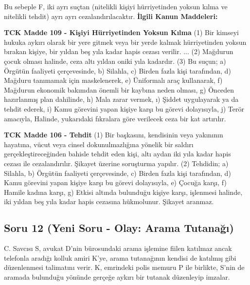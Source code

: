 \documentclass[a4paper, 11pt, twocolumn]{article}
\newenvironment{lawbox}{%
    \par\noindent
    \begin{tcolorbox}[
        colback=lawbg,
        colframe=boxcolor,
        fonttitle=\bfseries,
        boxrule=0.5pt,
        left=3pt,
        right=3pt,
        top=3pt,
        bottom=3pt,
        width=\columnwidth,
        arc=2pt,
        before skip=0.2cm,
        after skip=0.2cm
    ]
    \footnotesize\itshape
}{\end{tcolorbox}}
\begin{document}
Bu sebeple F, iki ayrı suçtan (nitelikli kişiyi hürriyetinden yoksun kılma ve nitelikli tehdit) ayrı ayrı cezalandırılacaktır.
\vspace{0.5cm}
\textbf{İlgili Kanun Maddeleri:}
\begin{lawbox}
\textbf{TCK Madde 109 - Kişiyi Hürriyetinden Yoksun Kılma}
\newline
(1) Bir kimseyi hukuka aykırı olarak bir yere gitmek veya bir yerde kalmak hürriyetinden yoksun bırakan kişiye, bir yıldan beş yıla kadar hapis cezası verilir.
...
(2) Mağdurun çocuk olması halinde, ceza altı yıldan oniki yıla kadardır.
\newline
(3) Bu suçun;
a) Örgütün faaliyeti çerçevesinde,
b) Silahla,
c) Birden fazla kişi tarafından,
d) Mağduru tanımamak için maskelenerek,
e) Üniformalı araç kullanarak,
f) Mağdurun ekonomik bakımdan önemli bir kaybına neden olması,
g) Önceden hazırlanmış plan dahilinde,
h) Mala zarar vermek,
ı) Şiddet uygulayarak ya da tehdit ederek,
i) Kamu görevini yapan kişiye karşı bu görevi dolayısıyla,
j) Terör amacıyla,
Halinde, yukarıdaki fıkralara göre verilecek ceza bir kat artırılır.
\end{lawbox}
\begin{lawbox}
\textbf{TCK Madde 106 - Tehdit}
\newline
(1) Bir başkasını, kendisinin veya yakınının hayatına, vücut veya cinsel dokunulmazlığına yönelik bir saldırı gerçekleştireceğinden bahisle tehdit eden kişi, altı aydan iki yıla kadar hapis cezası ile cezalandırılır. Şikayet üzerine soruşturma yapılır.
\newline
(2) Tehdidin;
a) Silahla,
b) Örgütün faaliyeti çerçevesinde,
c) Birden fazla kişi tarafından,
d) Kamu görevini yapan kişiye karşı bu görevi dolayısıyla,
e) Çocuğa karşı,
f) Hamile kadına karşı,
g) Etkisi altında bulunduğu kişiye karşı,
işlenmesi halinde, iki yıldan beş yıla kadar hapis cezasına hükmolunur. Şikayet aranmaz.
\end{lawbox}

\newpage

\subsection*{Soru 12 (Yeni Soru - Olay: Arama Tutanağı)}
C. Savcısı S, avukat D'nin bürosundaki arama işlemine fiilen katılmaz ancak telefonla aradığı kolluk amiri K'ye, arama tutanağının kendisi de katılmış gibi düzenlenmesi talimatını verir. K, emrindeki polis memuru P ile birlikte, S'nin de aramada bulunduğu yönünde gerçeğe aykırı bir tutanak düzenleyip imzalar.
\end{document}
